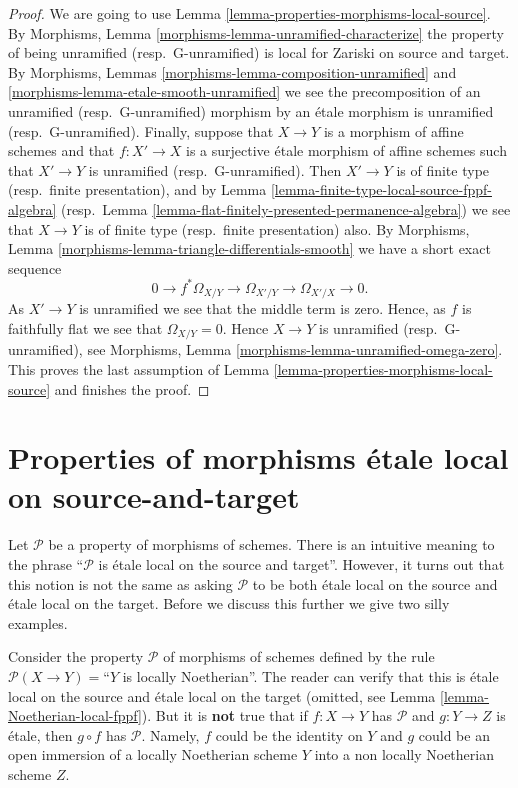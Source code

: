 \begin{proof}
We are going to use
Lemma \ref{lemma-properties-morphisms-local-source}.
By
Morphisms, Lemma \ref{morphisms-lemma-unramified-characterize}
the property of being unramified (resp.\ G-unramified)
is local for Zariski on source and target. By
Morphisms, Lemmas \ref{morphisms-lemma-composition-unramified} and
\ref{morphisms-lemma-etale-smooth-unramified}
we see the precomposition
of an unramified (resp.\ G-unramified) morphism by an \'etale morphism is
unramified (resp.\ G-unramified).
Finally, suppose that $X \to Y$ is a morphism of affine schemes
and that $f : X' \to X$ is a surjective \'etale morphism of affine schemes
such that $X' \to Y$ is unramified (resp.\ G-unramified).
Then $X' \to Y$ is of finite type (resp.\ finite presentation), and by
Lemma \ref{lemma-finite-type-local-source-fppf-algebra}
(resp.\ Lemma \ref{lemma-flat-finitely-presented-permanence-algebra})
we see that $X \to Y$ is of finite type (resp.\ finite presentation) also. By
Morphisms, Lemma \ref{morphisms-lemma-triangle-differentials-smooth}
we have a short exact sequence
$$
0 \to f^*\Omega_{X/Y} \to \Omega_{X'/Y} \to \Omega_{X'/X} \to 0.
$$
As $X' \to Y$ is unramified we see that the middle term is zero.
Hence, as $f$ is faithfully flat we see that $\Omega_{X/Y} = 0$.
Hence $X \to Y$ is unramified (resp.\ G-unramified), see
Morphisms, Lemma \ref{morphisms-lemma-unramified-omega-zero}.
This proves the last assumption of
Lemma \ref{lemma-properties-morphisms-local-source}
and finishes the proof.
\end{proof}




\section{Properties of morphisms \'etale local on source-and-target}
\label{section-properties-etale-local-source-target}

\noindent
Let $\mathcal{P}$ be a property of morphisms of schemes. There is an
intuitive meaning to the phrase ``$\mathcal{P}$ is \'etale local on the
source and target''. However, it turns out that this notion is not
the same as asking $\mathcal{P}$ to be both \'etale
local on the source and \'etale local on the target.
Before we discuss this further we give two silly examples.

\begin{example}
\label{example-silly-one}
Consider the property $\mathcal{P}$ of morphisms of schemes defined
by the rule $\mathcal{P}(X \to Y) = $``$Y$ is locally Noetherian''.
The reader can verify that this is \'etale local on the source and
\'etale local on the target (omitted, see
Lemma \ref{lemma-Noetherian-local-fppf}).
But it is {\bf not} true that if $f : X \to Y$ has $\mathcal{P}$
and $g : Y \to Z$ is \'etale, then $g \circ f$ has $\mathcal{P}$.
Namely, $f$ could be the identity on $Y$ and $g$ could be an open
immersion of a locally Noetherian scheme $Y$ into a non locally Noetherian
scheme $Z$.
\end{example}

